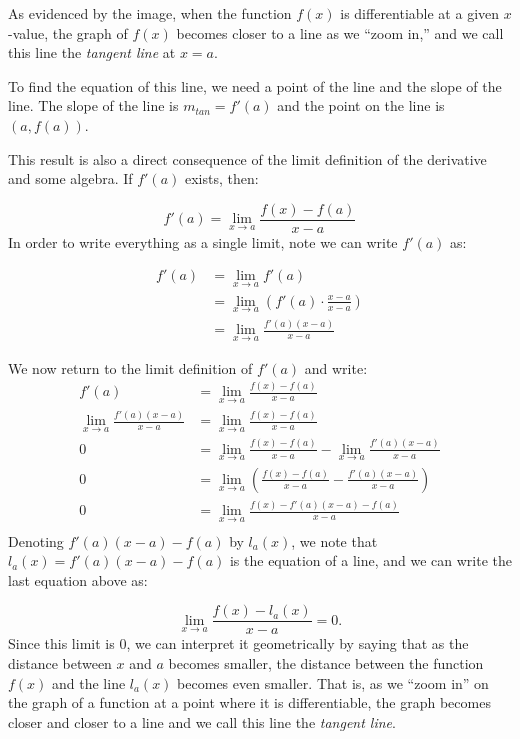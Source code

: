 \documentclass[nooutcomes]{ximera}
\begin{document}
As evidenced by the image, when the function $f(x)$ is differentiable
at a given $x$-value, the graph of $f(x)$ becomes closer to a line as
we ``zoom in,'' and we call this line the \emph{tangent line} at $x=a$.

To find the equation of this line, we need a point of the line and the
slope of the line.  The slope of the line is $m_{tan} =f'(a)$ and the
point on the line is $(a,f(a))$.


This result is also a direct consequence of the limit definition of
the derivative and some algebra.  If $f'(a)$ exists, then:

\[
f'(a) = \lim_{x \to a} \frac{f(x)-f(a)}{x-a}
\]
In order to write everything as a single limit, note we can write $f'(a)$ as:

\begin{align*}
  f'(a) &= \lim_{x \to a} f'(a)\\
  &= \lim_{x \to a} \left(f'(a) \cdot
  \frac{x-a}{x-a}\right)\\
  &= \lim_{x \to a} \frac{f'(a)(x-a)}{x-a}
\end{align*}

We now return to the limit definition of $f'(a)$ and write: 
\begin{align*}
f'(a) &= \lim_{x \to a} \frac{f(x)-f(a)}{x-a}\\
\lim_{x \to a} \frac{f'(a)(x-a)}{x-a} &= \lim_{x \to a} \frac{f(x)-f(a)}{x-a}\\
0 &= \lim_{x \to a} \frac{f(x)-f(a)}{x-a} - \lim_{x \to a} \frac{f'(a)(x-a)}{x-a}\\
0 &= \lim_{x \to a} \left(\frac{f(x)-f(a)}{x-a} - \frac{f'(a)(x-a)}{x-a} \right)\\
0 &= \lim_{x \to a} \frac{f(x)-f'(a)(x-a) - f(a)}{x-a}\\
\end{align*} 
Denoting $ f'(a)(x-a) - f(a)$ by $l_a(x)$, we note that $l_a(x)= f'(a)(x-a) - f(a)$ is the equation of a line, and we can write the last equation above as:

\[
\lim_{x \to a} \frac{f(x)-l_a(x)}{x-a} = 0.
\]
Since this limit is $0$, we can interpret it geometrically by saying
that as the distance between $x$ and $a$ becomes smaller, the distance
between the function $f(x)$ and the line $l_a(x)$ becomes even
smaller.  That is, as we ``zoom in'' on the graph of a function at a
point where it is differentiable, the graph becomes closer and closer
to a line and we call this line the \emph{tangent line}.
\end{document}
